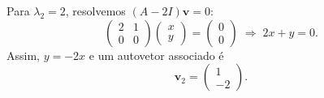 \begin{solutionbox}
  Para $\lambda_2 = 2$, resolvemos $(A - 2I)\mathbf{v} = 0$:
  \[
  \begin{pmatrix}
  2 & 1 \\
  0 & 0
  \end{pmatrix}
  \begin{pmatrix}
  x \\ y
  \end{pmatrix}
  =
  \begin{pmatrix}
  0 \\ 0
  \end{pmatrix}
  \;\Rightarrow\; 2x + y = 0.
  \]
  Assim, $y = -2x$ e um autovetor associado é
  \[
  \mathbf{v}_2 = \begin{pmatrix}1 \\ -2\end{pmatrix}.
  \]
\end{solutionbox}